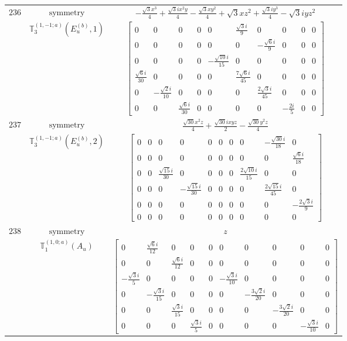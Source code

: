 \documentclass[fleqn,8pt,landscape]{jsarticle}
\begin{document}
\begin{longtable}{ccc}
$ 236 $ & $ \text{symmetry} $ & $ - \frac{\sqrt{3} x^{3}}{4} + \frac{\sqrt{3} i x^{2} y}{4} - \frac{\sqrt{3} x y^{2}}{4} + \sqrt{3} x z^{2} + \frac{\sqrt{3} i y^{3}}{4} - \sqrt{3} i y z^{2} $ \\
$  $ & $ \mathbb{T}_{3}^{(1,-1;a)}(E_{u}^{(b)},1) $ & $ \begin{bmatrix} 0 & 0 & 0 & 0 & 0 & \frac{\sqrt{3} i}{9} & 0 & 0 & 0 & 0 \\ 0 & 0 & 0 & 0 & 0 & 0 & - \frac{\sqrt{6} i}{9} & 0 & 0 & 0 \\ 0 & 0 & 0 & 0 & - \frac{\sqrt{10} i}{15} & 0 & 0 & 0 & 0 & 0 \\ \frac{\sqrt{6} i}{30} & 0 & 0 & 0 & 0 & \frac{7 \sqrt{6} i}{45} & 0 & 0 & 0 & 0 \\ 0 & - \frac{\sqrt{2} i}{10} & 0 & 0 & 0 & 0 & \frac{2 \sqrt{3} i}{45} & 0 & 0 & 0 \\ 0 & 0 & \frac{\sqrt{6} i}{30} & 0 & 0 & 0 & 0 & - \frac{2 i}{5} & 0 & 0 \end{bmatrix} $ \\ \hline
$ 237 $ & $ \text{symmetry} $ & $ \frac{\sqrt{30} x^{2} z}{4} + \frac{\sqrt{30} i x y z}{2} - \frac{\sqrt{30} y^{2} z}{4} $ \\
$  $ & $ \mathbb{T}_{3}^{(1,-1;a)}(E_{u}^{(b)},2) $ & $ \begin{bmatrix} 0 & 0 & 0 & 0 & 0 & 0 & 0 & 0 & - \frac{\sqrt{30} i}{18} & 0 \\ 0 & 0 & 0 & 0 & 0 & 0 & 0 & 0 & 0 & \frac{\sqrt{6} i}{18} \\ 0 & 0 & \frac{\sqrt{15} i}{30} & 0 & 0 & 0 & 0 & \frac{2 \sqrt{10} i}{15} & 0 & 0 \\ 0 & 0 & 0 & - \frac{\sqrt{15} i}{30} & 0 & 0 & 0 & 0 & \frac{2 \sqrt{15} i}{45} & 0 \\ 0 & 0 & 0 & 0 & 0 & 0 & 0 & 0 & 0 & - \frac{2 \sqrt{3} i}{9} \\ 0 & 0 & 0 & 0 & 0 & 0 & 0 & 0 & 0 & 0 \end{bmatrix} $ \\ \hline
$ 238 $ & $ \text{symmetry} $ & $ z $ \\
$  $ & $ \mathbb{T}_{1}^{(1,0;a)}(A_{u}) $ & $ \begin{bmatrix} 0 & \frac{\sqrt{6} i}{12} & 0 & 0 & 0 & 0 & 0 & 0 & 0 & 0 \\ 0 & 0 & \frac{\sqrt{6} i}{12} & 0 & 0 & 0 & 0 & 0 & 0 & 0 \\ - \frac{\sqrt{3} i}{5} & 0 & 0 & 0 & 0 & - \frac{\sqrt{3} i}{10} & 0 & 0 & 0 & 0 \\ 0 & - \frac{\sqrt{3} i}{15} & 0 & 0 & 0 & 0 & - \frac{3 \sqrt{2} i}{20} & 0 & 0 & 0 \\ 0 & 0 & \frac{\sqrt{3} i}{15} & 0 & 0 & 0 & 0 & - \frac{3 \sqrt{2} i}{20} & 0 & 0 \\ 0 & 0 & 0 & \frac{\sqrt{3} i}{5} & 0 & 0 & 0 & 0 & - \frac{\sqrt{3} i}{10} & 0 \end{bmatrix} $ \\ \hline

\end{longtable}
\end{document}
